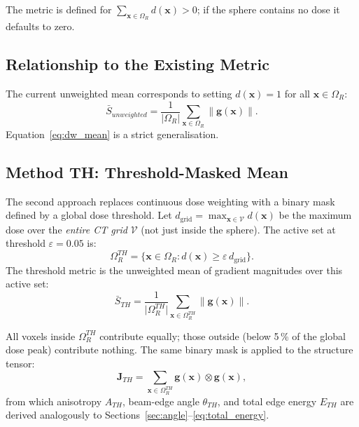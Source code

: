 \documentclass[11pt,a4paper]{article}
\newcommand{\vx}{\mathbf{x}}
\newcommand{\vg}{\mathbf{g}}
\newcommand{\vJ}{\mathbf{J}}
\newcommand{\norm}[1]{\left\|#1\right\|}
\begin{document}
The metric is defined for $\sum_{\vx \in \Omega_R} d(\vx) > 0$; if the
sphere contains no dose it defaults to zero.

\subsection{Relationship to the Existing Metric}

The current unweighted mean corresponds to setting $d(\vx) = 1$ for all
$\vx \in \Omega_R$:
\begin{equation}
    \bar{S}_{unweighted}
    = \frac{1}{|\Omega_R|}\sum_{\vx \in \Omega_R} \norm{\vg(\vx)}.
\end{equation}
Equation~\eqref{eq:dw_mean} is a strict generalisation.

\subsection{Method TH: Threshold-Masked Mean}
\label{sec:method_th}

The second approach replaces continuous dose weighting with a binary
mask defined by a global dose threshold.
Let $d_{\mathrm{grid}} = \max_{\vx \in \mathcal{V}} d(\vx)$ be the maximum
dose over the \emph{entire CT grid} $\mathcal{V}$ (not just inside the
sphere).
The active set at threshold $\varepsilon = 0.05$ is:
\begin{equation}
    \Omega_R^{TH}
    = \bigl\{\vx \in \Omega_R : d(\vx) \geq \varepsilon\,d_{\mathrm{grid}}\bigr\}.
    \label{eq:active_set}
\end{equation}
The threshold metric is the unweighted mean of gradient magnitudes over this
active set:
\begin{equation}
    \boxed{
    \bar{S}_{TH}
    = \frac{1}{\lvert\Omega_R^{TH}\rvert}
      \sum_{\vx \in \Omega_R^{TH}} \norm{\vg(\vx)}.
    }
    \label{eq:th_mean}
\end{equation}

All voxels inside $\Omega_R^{TH}$ contribute equally; those outside (below
5\,\% of the global dose peak) contribute nothing.
The same binary mask is applied to the structure tensor:
\begin{equation}
    \vJ_{TH}
    = \sum_{\vx \in \Omega_R^{TH}} \vg(\vx)\otimes\vg(\vx),
    \label{eq:th_tensor}
\end{equation}
from which anisotropy $A_{TH}$, beam-edge angle $\theta_{TH}$, and total
edge energy $E_{TH}$ are derived analogously to
Sections~\ref{sec:angle}--\ref{eq:total_energy}.
\end{document}
